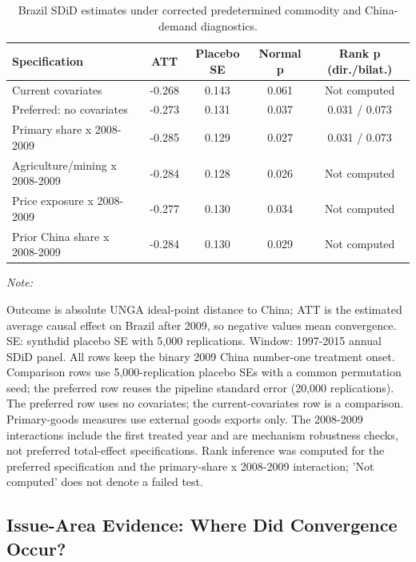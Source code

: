 \documentclass[
  12pt,
]{article}
\begin{document}
\begin{table}[H]
\centering
\caption{\label{tab:china-demand-sdid-diagnostics}Brazil SDiD estimates under corrected predetermined commodity and China-demand diagnostics.}
\centering
\fontsize{9}{11}\selectfont
\begin{threeparttable}
\begin{tabular}[t]{lcccc}
\toprule
Specification & ATT & Placebo SE & Normal p & Rank p (dir./bilat.)\\
\midrule
Current covariates & -0.268 & 0.143 & 0.061 & Not computed\\
Preferred: no covariates & -0.273 & 0.131 & 0.037 & 0.031 / 0.073\\
Primary share x 2008-2009 & -0.285 & 0.129 & 0.027 & 0.031 / 0.073\\
Agriculture/mining x 2008-2009 & -0.284 & 0.128 & 0.026 & Not computed\\
Price exposure x 2008-2009 & -0.277 & 0.130 & 0.034 & Not computed\\
\addlinespace
Prior China share x 2008-2009 & -0.284 & 0.130 & 0.029 & Not computed\\
\bottomrule
\end{tabular}
\begin{tablenotes}
\item \textit{Note: } 
\item Outcome is absolute UNGA ideal-point distance to China; ATT is the estimated average causal effect on Brazil after 2009, so negative values mean convergence. SE: synthdid placebo SE with 5,000 replications. Window: 1997-2015 annual SDiD panel. All rows keep the binary 2009 China number-one treatment onset. Comparison rows use 5,000-replication placebo SEs with a common permutation seed; the preferred row reuses the pipeline standard error (20,000 replications). The preferred row uses no covariates; the current-covariates row is a comparison. Primary-goods measures use external goods exports only. The 2008-2009 interactions include the first treated year and are mechanism robustness checks, not preferred total-effect specifications. Rank inference was computed for the preferred specification and the primary-share x 2008-2009 interaction; 'Not computed' does not denote a failed test.
\end{tablenotes}
\end{threeparttable}
\end{table}

\subsection{Issue-Area Evidence: Where Did Convergence Occur?}\label{issue-area-evidence-where-did-convergence-occur}
\end{document}
